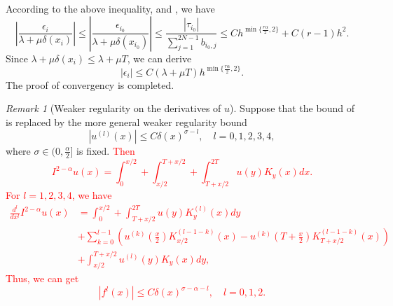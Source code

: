 \documentclass{amsart}
\theoremstyle{definition}
\theoremstyle{remark}
\newtheorem{remark}[theorem]{Remark}
\numberwithin{equation}{section}
\begin{document}
According to the above inequality,  and , we have
\begin{equation*}
  \left|\frac{\epsilon_{i}}{\lambda +  \mu\delta(x_{i})}\right| \le \left|\frac{\epsilon_{i_0}}{\lambda +  \mu\delta(x_{i_0})}\right| 
  \le \frac{|\tau_{i_0}|}{\sum_{j=1}^{2N-1} b_{i_0, j}}
  \le C h^{\min\{\frac{r\alpha}{2}, 2\}} + C (r-1) h^2 .
\end{equation*}
Since \(\lambda + \mu\delta(x_{i}) \le \lambda + \mu T\), we can derive
\begin{equation*}
  |\epsilon_i| \le C(\lambda + \mu T) h^{\min\{\frac{r\alpha}{2}, 2\}} .
\end{equation*}
The proof of convergency is completed.

\begin{remark}[Weaker regularity on the derivatives of \(u\)]
\label{rmk:weak-reg-u}
  Suppose that the bound of 
  is replaced by the more general weaker regularity bound
  \begin{equation*}
    |u^{(l)}(x)| \le C \delta(x)^{\sigma-l}, \quad l=0,1,2,3,4,
  \end{equation*}
  where \(\sigma \in (0, \frac{\alpha}{2}]\) is fixed. 
  \textcolor{red}{
  Then
  \begin{equation*}
    I^{2-\alpha}u(x) = \int_{0}^{x/2} + \int_{x/2}^{T+x/2} + \int_{T+x/2}^{2T} u(y)K_y(x) dx.
  \end{equation*}
  For \(l=1,2,3,4\), we have
  \begin{equation*}
    \begin{aligned}
      \frac{d^l}{dx^l}I^{2-\alpha}u(x)
      &= \int_{0}^{x/2}  + \int_{T+x/2}^{2T} u(y) K_y^{(l)}(x)dy \\
      &+ \sum_{k=0}^{l-1} \left( u^{(k)}(\frac{x}{2})K_{x/2}^{(l-1-k)}(x) -  u^{(k)}(T+\frac{x}{2})K_{T+x/2}^{(l-1-k)}(x) \right) \\
      &+ \int_{x/2}^{T+x/2} u^{(l)}(y) K_y(x)dy ,
    \end{aligned}
  \end{equation*}
  Thus, we can get
  \begin{equation*} \label{reg-f-weak}
    |f^{l}(x)| \le C \delta(x)^{\sigma-\alpha-l}, \quad l=0,1,2.
  \end{equation*}
  }
  

\end{remark}
\end{document}
